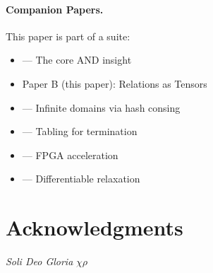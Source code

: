 \documentclass[11pt,a4paper]{article}
\begin{document}
\paragraph{Companion Papers.}
This paper is part of a suite:
\begin{itemize}
  \item \paperA{} --- The core AND insight
  \item Paper B (this paper): Relations as Tensors
  \item \paperC{} --- Infinite domains via hash consing
  \item \paperD{} --- Tabling for termination
  \item \paperE{} --- FPGA acceleration
  \item \paperF{} --- Differentiable relaxation
\end{itemize}

\section*{Acknowledgments}

\standardacknowledgments





\vspace{1em}
\begin{center}
\textit{Soli Deo Gloria} $\chi\rho$
\end{center}
\end{document}
